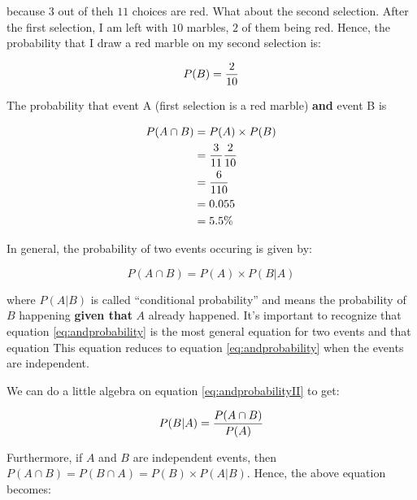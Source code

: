 
because $3$ out of theh $11$ choices are red.  What about the second
selection.  After the first selection, I am left with $10$ marbles,
$2$ of them being red.  Hence, the probability that I draw a red
marble on my second selection is:

\begin{equation}
 P(B) = {2\over 10}\nonumber
\end{equation}

The probability that event A (first selection is a red marble)
\textbf{and} event B is

\begin{align}
  P(A \cap B) &= P(A) \times P(B)\nonumber\\
              &= {3\over 11} {2\over 10}\nonumber\\
              &= {6 \over 110}\nonumber\\
              &= 0.055 \nonumber\\
              &= 5.5\%\nonumber
\end{align}



In general, the probability of two events occuring is given by:

\begin{equation}\label{eq:andprobabilityII}
  P(A \cap B) = P(A) \times P(B|A)
\end{equation}

where $P(A|B)$ is called ``conditional probability'' and means the
probability of $B$ happening \textbf{given that} $A$ already happened.
It's important to recognize that equation \eqref{eq:andprobability} is
the most general equation for two events and that equation  This equation reduces to equation
\eqref{eq:andprobability} when the events are independent.

We can do a little algebra on equation \eqref{eq:andprobabilityII} to
get:

\begin{equation}
  P(B|A) = {P(A \cap B)\over P(A)}
\end{equation}

Furthermore, if $A$ and $B$ are independent events, then $P(A\cap B) =
P(B \cap A) = P(B) \times P(A|B)$.  Hence, the above equation becomes:

